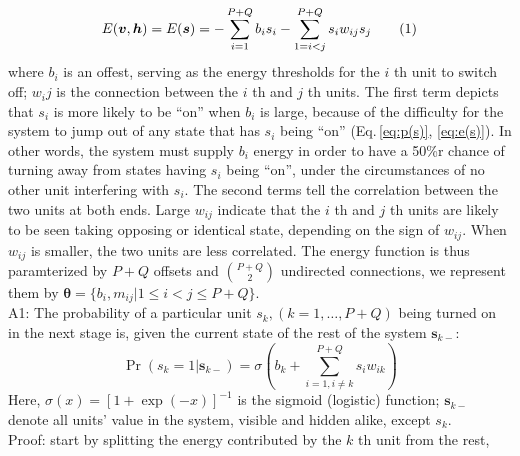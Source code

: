 \documentclass[11pt]{article}
\newcommand\numberthis{\addtocounter{equation}{1}\tag{\theequation}}
\newcommand{\vh}{\boldsymbol{h}}
\newcommand{\vv}{\boldsymbol{v}}
\newcommand{\vs}{\boldsymbol{s}}
\newcommand{\pEC}{\boldsymbol{\theta}}
\begin{document}
\begin{align*}\label{eq:e(s)} %
    E(\vv, \vh) = E(\vs) = -\sum_{i=1}^{P+Q} b_i s_i - \sum_{1 = i < j}^{P+Q} s_i w_{ij} s_j \numberthis
\end{align*}
where $b_i$ is an offest, serving as the energy thresholds for the $i$ th unit to switch off; $w_ij$ is the connection between the $i$ th and $j$ th units. The first term depicts that $s_i$ is more likely to be ``on'' when $b_i$ is large, because of the difficulty for the system to jump out of any state that has $s_i$ being ``on'' (Eq.\,\ref{eq:p(s)}, \ref{eq:e(s)}). In other words, the system must supply $b_i$ energy in order to have a 50\%r chance of turning away from states having $s_i$ being ``on'', under the circumstances of no other unit interfering with $s_i$. The second terms tell the correlation between the two units at both ends. Large $w_{ij}$ indicate that the $i$ th and $j$ th units are likely to be seen taking opposing or identical state, depending on the sign of $w_{ij}$. When $w_{ij}$ is smaller, the two units are less correlated. The energy function is thus paramterized by $P+Q$ offsets and $P+Q \choose 2$ undirected connections, we represent them by $\pEC = \{b_i, m_{ij} | 1 \le i < j \le P+Q\}$. \\
A1: The probability of a particular unit $s_k, (k = 1, \dots, P+Q)$ being turned on in the next stage is, given the current state of the rest of the system $\vs_{k-}$:
\begin{equation}\label{eq:p(s_k=1)}
  \Pr(s_k = 1|\vs_{k-}) = \sigma(b_k + \sum_{i=1, i \ne k}^{P+Q}{s_i w_{ik}})
\end{equation}
Here,  $\sigma(x) = [1 + \exp({-x})]^{-1}$ is the sigmoid (logistic) function; $\vs_{k-}$ denote all units' value in the system, visible and hidden alike, except $s_k$. \\
Proof: start by splitting the energy contributed by the $k$ th unit from the rest,
\newcommand{\st}{\tilde{s}}
\end{document}
